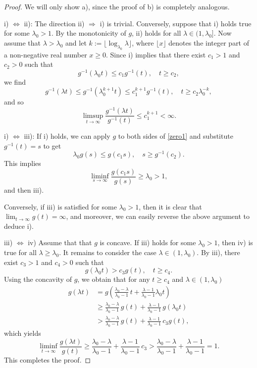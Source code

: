 \documentclass{aptpub}
\numberwithin{equation}{section}
\begin{document}
\begin{proof}
    We will only show a), since the proof of b) is completely analogous.

\medskip\noindent
    i) $\Leftrightarrow$ ii): The direction ii) $\Rightarrow$ i) is trivial. Conversely, suppose that i) holds true for some $\lambda_0>1$. By the monotonicity of $g$, ii) holds for all $\lambda\in(1,\lambda_0]$. Now assume that $\lambda>\lambda_0$ and let $k:=\lfloor\log_{\lambda_0}\lambda\rfloor$, where $\lfloor x\rfloor$ denotes the integer part of a non-negative real number $x\geq 0$. Since i) implies that there exist $c_1>1$ and $c_2>0$ such that
    \begin{equation}\label{zero1}
            g^{-1}(\lambda_0t)\leq c_1g^{-1}(t),\quad t\geq c_2,
    \end{equation}
    we find
    $$
            g^{-1}(\lambda t)\leq g^{-1}\left(\lambda_0^{k+1}t\right)
            \leq c_1^{k+1}g^{-1}(t),\quad t\geq c_2\lambda_0^{-k},
    $$
    and so
    $$
            \limsup_{t\to\infty}\frac{g^{-1}(\lambda t)}{g^{-1}(t)}
            \leq c_1^{k+1}<\infty.
    $$

\medskip\noindent
    i) $\Leftrightarrow$ iii):
    If i) holds, we can apply $g$ to both sides of \eqref{zero1} and substitute $g^{-1}(t)=s$ to get
    $$
        \lambda_0g(s)\leq g(c_1s),\quad s\geq g^{-1}(c_2).
    $$
    This implies
    $$
        \liminf_{s\to\infty}\frac{g(c_1s)}{g(s)}
        \geq \lambda_0>1,
    $$
    and then iii).

    Conversely, if iii) is satisfied for some $\lambda_0>1$, then it is clear that $\lim_{t\to\infty}g(t)=\infty$, and moreover, we can easily reverse the above argument to deduce i).

\medskip\noindent
    iii) $\Leftrightarrow$ iv) Assume that that $g$ is concave. If  iii) holds for some $\lambda_0>1$, then iv) is true for all $\lambda\geq\lambda_0$. It remains to consider the case $\lambda\in(1,\lambda_0)$. By iii), there exist $c_3>1$ and $c_4>0$ such that
    $$
        g(\lambda_0t)>c_3g(t),\quad t\geq c_4.
    $$
    Using the concavity of $g$, we obtain that for any $t\geq c_4$ and $\lambda\in (1,\lambda_0)$
    \begin{align*}
        g(\lambda t)
        &= g\left(\frac{\lambda_0-\lambda}{\lambda_0-1}\,t + \frac{\lambda-1}{\lambda_0-1}\lambda_0t \right)\\
        &\geq \frac{\lambda_0-\lambda}{\lambda_0-1}\,g(t)+\frac{\lambda-1}{\lambda_0-1}\,g(\lambda_0t)\\
        &> \frac{\lambda_0-\lambda}{\lambda_0-1}\,g(t)+\frac{\lambda-1}{\lambda_0-1}\,c_3g(t),
    \end{align*}
     which yields
     $$
         \liminf_{t\to\infty}\frac{g(\lambda t)}{g(t)}
         \geq\frac{\lambda_0-\lambda}{\lambda_0-1}+\frac{\lambda-1}{\lambda_0-1}\,c_3
         >\frac{\lambda_0-\lambda}{\lambda_0-1}+\frac{\lambda-1}{\lambda_0-1}=1.
     $$
     This completes the proof.
\end{proof}
\end{document}
